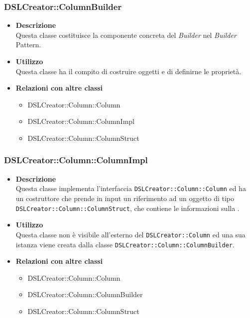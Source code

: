  \subsubsection{DSLCreator::ColumnBuilder}
                    \begin{itemize}
                        \item \textbf{Descrizione} \hfill \\
                          Questa classe costituisce la componente concreta del \textit{Builder} nel \textit{Builder} Pattern.
                        \item \textbf{Utilizzo} \hfill \\
                          Questa classe ha il compito di costruire oggetti  e di definirne le proprietà.
                        \item \textbf{Relazioni con altre classi}
                            \begin{itemize}
                              \item DSLCreator::Column::Column
                              \item DSLCreator::Column::ColumnImpl
                              \item DSLCreator::Column::ColumnStruct
                            \end{itemize}
                    \end{itemize}  

 \subsubsection{DSLCreator::Column::ColumnImpl}
                    \begin{itemize}
                        \item \textbf{Descrizione} \hfill \\
                          Questa classe implementa l'interfaccia \texttt{DSLCreator::Column::Column} ed ha un costruttore che prende in input un riferimento ad un oggetto di tipo \texttt{DSLCreator::Co\-lumn::ColumnStruct}, che contiene le informazioni sulla .
                        \item \textbf{Utilizzo} \hfill \\
                          Questa classe non è visibile all'esterno del  \texttt{DSLCreator::Column} ed una sua istanza viene creata dalla classe \texttt{DSLCreator::Column::ColumnBuilder}.
                        \item \textbf{Relazioni con altre classi}
                            \begin{itemize}
                              \item DSLCreator::Column::Column
                              \item DSLCreator::Column::ColumnBuilder
                              \item DSLCreator::Column::ColumnStruct
                            \end{itemize}
                    \end{itemize}  

